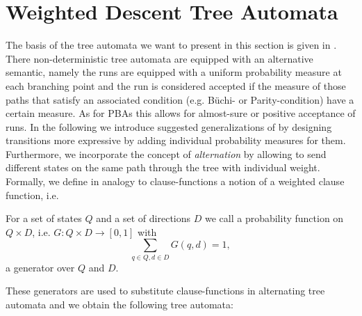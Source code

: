 \section{Weighted Descent Tree Automata}
The basis of the tree automata we want to present in this section is given in
\cite{RandAutoInfTrees}. There non-deterministic tree automata are equipped 
with an alternative semantic, namely the runs are equipped with a uniform 
probability measure at each branching point and the run is considered 
accepted if the measure of those paths that satisfy an associated condition
(e.g. Büchi- or Parity-condition) have a certain measure. As for \acp{PBA} this
allows for almost-sure or positive acceptance of runs. In the following we 
introduce suggested generalizations of \cite{RandAutoInfTrees} by designing 
transitions more expressive by adding individual probability measures for them.
Furthermore, we incorporate the concept of \emph{alternation} by allowing to 
send different states on the same path through the tree with individual weight.
Formally, we define in analogy to clause-functions a notion of a weighted 
clause function, i.e.
\begin{definition}[Generator]
  For a set of states $Q$ and a set of directions $D$ we call a probability
  function on $Q\times D$, i.e. $G: Q\times D\rightarrow [0,1]$ with
  \begin{equation*}
    \sum\limits_{q\in Q,d\in D}G(q,d) = 1,
  \end{equation*} 
  a generator over $Q$ and $D$. 
\end{definition}
These generators are used to substitute clause-functions in alternating tree
automata and we obtain the following tree automata:
